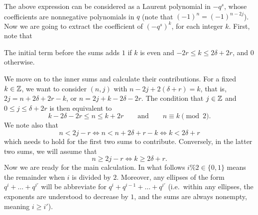 The above expression can be considered as a Laurent polynomial in $-q^s$,
whose coefficients are nonnegative polynomials in $q$ (note that $(-1)^n = (-1)^{n-2j}$).
Now we are going to extract the coefficient of $(-q^s)^k$, for each integer $k$.
First, note that
\begin{itemize}
  \ii The initial term before the sums adds $1$
  if $k$ is even and $-2r \le k \le 2\delta + 2r$, and $0$ otherwise.
\end{itemize}
We move on to the inner sums and calculate their contributions.
For a fixed $k \in \mathbb Z$, we want to consider $(n,j)$ with $n-2j + 2(\delta+r) = k$,
that is, $2j = n + 2\delta + 2r - k$, or $n = 2j + k - 2\delta - 2r$.
The condition that $j \in \mathbb Z$ and $0 \le j \le \delta+2r$ is then equivalent to
\begin{equation}
  k-2\delta-2r \le n \le k+2r \qquad\text{and}\qquad n \equiv k \pmod 2.
  \label{eq:outer_assumption}
\end{equation}
We note also that
\begin{equation}
  n < 2j-r \iff n < n + 2 \delta + r - k \iff k < 2\delta + r
  \label{eq:outer_half_assumption_12}
\end{equation}
which needs to hold for the first two sums to contribute.
Conversely, in the latter two sums, we will assume that
\begin{equation}
  n \ge 2j-r \iff k \ge 2\delta + r.
  \label{eq:outer_half_assumption_34}
\end{equation}
Now we are ready for the main calculation.
In what follows $i \% 2 \in \{0,1\}$ means the remainder when $i$ is divided by $2$.
Moreover, any ellipses of the form $q^i + \dots + q^{i'}$
will be abbreviate for $q^i + q^{i-1} + \dots + q^{i'}$
(i.e.\ within any ellipses, the exponents are understood to decrease by $1$,
and the sums are always nonempty, meaning $i \ge i'$).

